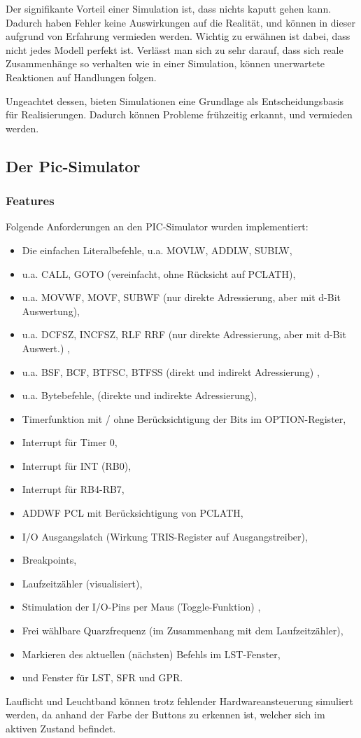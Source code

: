 \documentclass[
10pt, %
a4paper, %
oneside, %
headinclude,footinclude, %
BCOR5mm, %
]{scrartcl}
\begin{document}
	Der signifikante Vorteil einer Simulation ist, dass nichts kaputt gehen kann. Dadurch haben Fehler keine Auswirkungen auf die Realität, und können in dieser aufgrund von Erfahrung vermieden werden. Wichtig zu erwähnen ist dabei, dass nicht jedes Modell perfekt ist. Verlässt man sich zu sehr darauf, dass sich reale Zusammenhänge so verhalten wie in einer Simulation, können unerwartete Reaktionen auf Handlungen folgen.
	
	Ungeachtet dessen, bieten Simulationen eine Grundlage als Entscheidungsbasis für Realisierungen. Dadurch können Probleme frühzeitig erkannt, und vermieden werden.
\subsection{Der Pic-Simulator}
	\subsubsection{Features}
		Folgende Anforderungen an den PIC-Simulator wurden implementiert:
			\begin{itemize}
				\item Die einfachen Literalbefehle, u.a. MOVLW, ADDLW, SUBLW,
				\item u.a. CALL, GOTO (vereinfacht, ohne Rücksicht auf PCLATH),
				\item u.a. MOVWF, MOVF, SUBWF (nur direkte Adressierung, aber mit d-Bit Auswertung),
				\item u.a. DCFSZ, INCFSZ, RLF RRF (nur direkte Adressierung, aber mit d-Bit Auswert.) ,
				\item u.a. BSF, BCF, BTFSC, BTFSS (direkt und indirekt Adressierung) ,
				\item u.a. Bytebefehle, (direkte und indirekte Adressierung),
				\item Timerfunktion mit / ohne Berücksichtigung der Bits im OPTION-Register,
				\item Interrupt für Timer 0,
				\item Interrupt für INT (RB0),
				\item Interrupt für RB4-RB7,
				\item ADDWF PCL mit Berücksichtigung von PCLATH,
				\item I/O Ausgangslatch (Wirkung TRIS-Register auf Ausgangstreiber),
				\item Breakpoints,
				\item Laufzeitzähler (visualisiert),
				\item Stimulation der I/O-Pins per Maus (Toggle-Funktion) ,
				\item Frei wählbare Quarzfrequenz (im Zusammenhang mit dem Laufzeitzähler),
				\item Markieren des aktuellen (nächsten) Befehls im LST-Fenster,
				\item und Fenster für LST, SFR und GPR.
			\end{itemize}
		Lauflicht und Leuchtband können trotz fehlender Hardwareansteuerung simuliert werden, da anhand der Farbe der Buttons zu erkennen ist, welcher sich im aktiven Zustand befindet.
		
\end{document}
